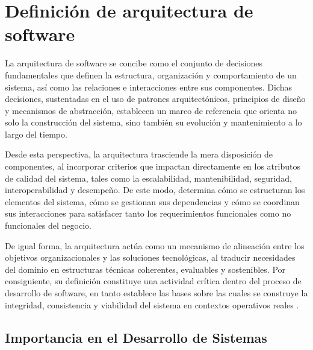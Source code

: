 \section{Definición de arquitectura de software}

La arquitectura de software se concibe como el conjunto de decisiones fundamentales que definen la estructura, organización y comportamiento de un sistema, así como las relaciones e interacciones entre sus componentes. Dichas decisiones, sustentadas en el uso de patrones arquitectónicos, principios de diseño y mecanismos de abstracción, establecen un marco de referencia que orienta no solo la construcción del sistema, sino también su evolución y mantenimiento a lo largo del tiempo.

Desde esta perspectiva, la arquitectura trasciende la mera disposición de componentes, al incorporar criterios que impactan directamente en los atributos de calidad del sistema, tales como la escalabilidad, mantenibilidad, seguridad, interoperabilidad y desempeño. De este modo, determina cómo se estructuran los elementos del sistema, cómo se gestionan sus dependencias y cómo se coordinan sus interacciones para satisfacer tanto los requerimientos funcionales como no funcionales del negocio.

De igual forma, la arquitectura actúa como un mecanismo de alineación entre los objetivos organizacionales y las soluciones tecnológicas, al traducir necesidades del dominio en estructuras técnicas coherentes, evaluables y sostenibles. Por consiguiente, su definición constituye una actividad crítica dentro del proceso de desarrollo de software, en tanto establece las bases sobre las cuales se construye la integridad, consistencia y viabilidad del sistema en contextos operativos reales \cite{27}.

\subsection{Importancia en el Desarrollo de Sistemas}


